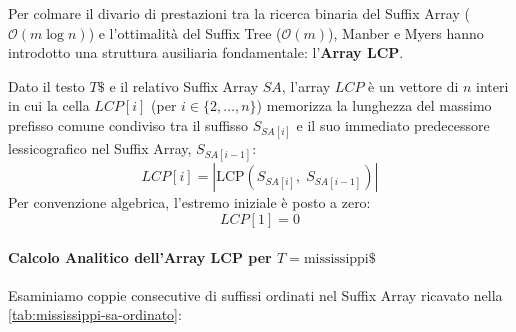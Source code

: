 Per colmare il divario di prestazioni tra la ricerca binaria del Suffix Array ($\mathcal{O}(m \log n)$) e l'ottimalit\`a del Suffix Tree ($\mathcal{O}(m)$), Manber e Myers hanno introdotto una struttura ausiliaria fondamentale: l'\textbf{Array LCP}.

\begin{definition}
Dato il testo $T\$$ e il relativo Suffix Array $SA$, l'array \textbf{$LCP$} \`e un vettore di $n$ interi in cui la cella $LCP[i]$ (per $i \in \{2, \dots, n\}$) memorizza la lunghezza del massimo prefisso comune condiviso tra il suffisso $S_{SA[i]}$ e il suo immediato predecessore lessicografico nel Suffix Array, $S_{SA[i-1]}$:
\begin{equation}
  LCP[i] = |\text{LCP}(S_{SA[i]}, \; S_{SA[i-1]})|
\end{equation}
Per convenzione algebrica, l'estremo iniziale \`e posto a zero:
\begin{equation}
  LCP[1] = 0
\end{equation}
\end{definition}

\paragraph{Calcolo Analitico dell'Array LCP per $T = \text{mississippi}\$$}
Esaminiamo coppie consecutive di suffissi ordinati nel Suffix Array ricavato nella \autoref{tab:mississippi-sa-ordinato}:

